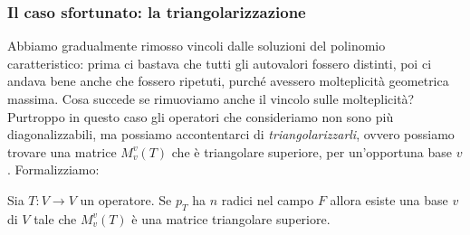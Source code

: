 \documentclass[11pt]{scrartcl}
\begin{document}
   	 \subsubsection{Il caso sfortunato: la triangolarizzazione}
   	 Abbiamo gradualmente rimosso vincoli dalle soluzioni del polinomio caratteristico: prima ci bastava che tutti gli autovalori fossero distinti, poi ci andava bene anche che fossero ripetuti, purché avessero molteplicità geometrica massima. Cosa succede se rimuoviamo anche il vincolo sulle molteplicità? Purtroppo in questo caso gli operatori che consideriamo non sono più diagonalizzabili, ma possiamo accontentarci di \textit{triangolarizzarli}, ovvero possiamo trovare una matrice $M_v^v(T)$ che è triangolare superiore, per un'opportuna base $v$. Formalizziamo:
   	 \begin{theorem}
   	 	Sia $T:V\to V$ un operatore. Se $p_T$ ha $n$ radici nel campo $F$ allora esiste una base $v$ di $V$ tale che $M_v^v(T)$ è una matrice triangolare superiore. 
   	 \end{theorem} 
\end{document}
